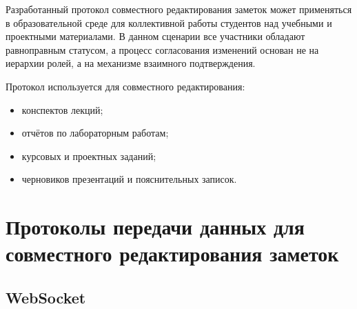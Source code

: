 Разработанный протокол совместного редактирования заметок может применяться в образовательной среде для коллективной работы студентов над учебными и проектными материалами. В данном сценарии все участники обладают равноправным статусом, а процесс согласования изменений основан не на иерархии ролей, а на механизме взаимного подтверждения.

Протокол используется для совместного редактирования:

\begin{itemize}
    \item конспектов лекций;
    \item отчётов по лабораторным работам;
    \item курсовых и проектных заданий;
    \item черновиков презентаций и пояснительных записок.
\end{itemize}






\section{Протоколы передачи данных для совместного редактирования заметок}

\subsection*{WebSocket}

